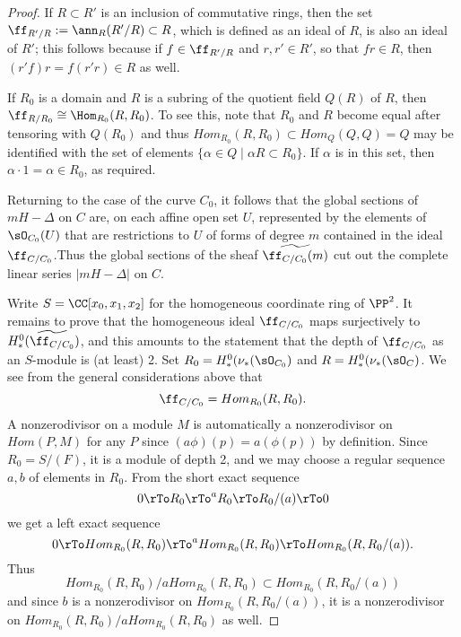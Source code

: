 \begin{proof}
If $R\subset R'$ is an inclusion of commutative rings, then the set
$\ff_{R'/R} := \ann_{R}(R'/R)\subset R$, which is defined as an ideal of $R$, is also an ideal of $R'$; this follows
because if $f\in \ff_{R'/R} $ and $r, r'\in R'$, so that $fr \in R$, then $(r'f)r = f(r'r) \in R$ as well. 

If $R_{0}$ is a domain and $R$ is a subring of the quotient field $Q(R)$ of $R$, then
 $\ff_{R/R_{0}} \cong \Hom_{R_{0}}(R, R_{0})$. To see this, note that $R_{0}$ and $R$ become
 equal after tensoring with $Q(R_{0})$ and thus 
 $Hom_{R_{0}}(R,R_{0}) \subset Hom_{Q}(Q,Q) = Q$ 
 may be identified
 with the set of elements $\{\alpha\in Q\mid \alpha R \subset R_{0}\}$. If $\alpha$ is in this set, then
  $\alpha\cdot 1 = \alpha \in R_{0}$, as required.
  
Returning to the case of the curve $C_{0}$, it follows that the global sections of $mH -\Delta$ on $C$
are, on each affine open set $U$, represented by the elements of $\sO_{C_{0}}(U)$ that  are restrictions to $U$
of forms of degree $m$ contained in 
the ideal $\ff_{C/C_{0}}$.Thus
the global sections of the sheaf $\widetilde{\ff_{C/C_{0}}(m)}$ cut out the complete linear series $|mH-\Delta|$
on $C$.

Write $S =\CC[x_{0}, x_{1}, x_{2}]$ for the homogeneous coordinate ring of $\PP^{2}$.
It remains to prove that the homogeneous ideal $\ff_{C/C_{0}}$ maps
surjectively to $H^{0}_{*}(\widetilde{\ff_{C/C_{0}}})$, and this amounts to the
statement that the depth of $\ff_{C/C_{0}}$ as an $S$-module is (at least) 2.
Set $R_{0} = H^{0}_{*}(\nu_{*} (\sO_{C_{0}})$ and $R = H^{0}_{*}(\nu_{*} (\sO_{C})$.
We see from the general considerations above that
$$
\ff_{C/C_{0}} = Hom_{R_{0}}(R, R_{0}).
$$ 
A nonzerodivisor on a module $M$
is automatically a nonzerodivisor on $Hom(P, M)$ for any $P$ since $(a\phi)(p) = a(\phi(p))$ by definition. 
Since $R_{0} = S/(F)$, it is a module of depth 2, and we may choose a regular sequence
$a,b$ of elements in $R_{0}$. From the short exact sequence
$$
0\rTo R_{0}\rTo^{a} R_{0}\rTo R_{0}/(a) \rTo 0
$$
we get a left exact sequence
$$
0\rTo Hom_{R_{0}}(R,R_{0})\rTo^{a} Hom_{R_{0}}(R,R_{0})\rTo Hom_{R_{0}}(R,R_{0}/(a)).
$$
Thus 
$$
Hom_{R_{0}}(R,R_{0})/aHom_{R_{0}}(R,R_{0}) \subset Hom_{R_{0}}(R,R_{0}/(a))
$$
and since $b$ is a nonzerodivisor on $Hom_{R_{0}}(R,R_{0}/(a))$, it is a nonzerodivisor
on $Hom_{R_{0}}(R,R_{0})/aHom_{R_{0}}(R,R_{0})$ as well.
\end{proof}

